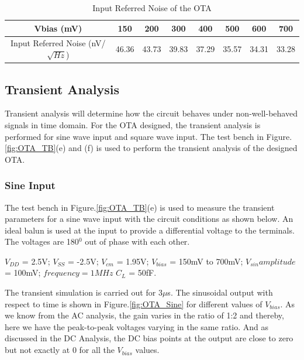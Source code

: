 \begin{table} [H]
\centering
\begin{tabular}{@{}cccccccc@{}}
\toprule
Vbias (mV)					& 150			& 200			& 300			& 400			& 500			& 600			& 700 \\ \midrule
Input Referred Noise (nV/$\sqrt{Hz}$)			& 46.36		& 43.73		& 39.83		& 37.29		& 35.57		& 34.31		& 33.28 \\
\bottomrule
\end{tabular}
\caption{Input Referred Noise of the OTA}
\label{tab:OTA_Noise}
\end{table}

\subsection{Transient Analysis}
Transient analysis will determine how the circuit behaves under non-well-behaved signals in time domain. For the OTA designed, the transient analysis is performed for sine wave input and square wave input. The test bench in Figure.\ref{fig:OTA_TB}(e) and (f) is used to perform the transient analysis of the designed OTA.

\subsubsection{Sine Input}
The test bench in Figure.\ref{fig:OTA_TB}(e) is used to measure the transient parameters for a sine wave input with the circuit conditions as shown below. An ideal balun is used at the input to provide a differential voltage to the terminals. The voltages are 180$^0$ out of phase with each other. 

$V_{DD}$ = 2.5V; $V_{SS}$ = -2.5V; $V_{cm}$ = 1.95V; $V_{bias}$ = 150mV to 700mV;  $V_{sin} amplitude$ = 100mV; $frequency = 1MHz$ $C_{L}$ = 50fF.

The transient simulation is carried out for 3$\mu $s. The sinusoidal output with respect to time is shown in Figure.\ref{fig:OTA_Sine} for different values of $V_{bias}$. As we know from the AC analysis, the gain varies in the ratio of 1:2 and thereby, here we have the peak-to-peak voltages varying in the same ratio. And as discussed in the DC Analysis, the DC bias points at the output are close to zero but not exactly at 0 for all the $V_{bias}$ values.

